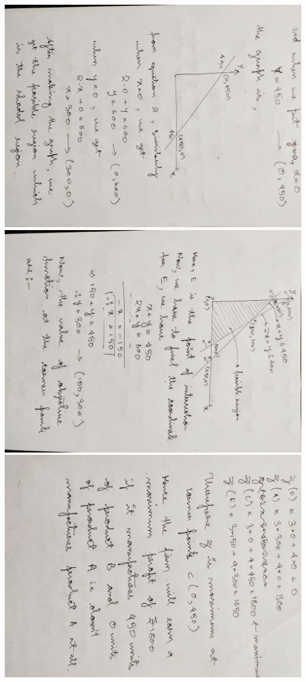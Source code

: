 \documentclass[12pt, letterpaper, twoside]{book}
\begin{document}
\includegraphics[width=\paperheight, height=\paperwidth, angle=90]{Page3}
\includegraphics[width=\paperheight, height=\paperwidth, angle=90]{Page4}
\includegraphics[width=\paperheight, height=\paperwidth, angle=90]{Page5}
\end{document}
